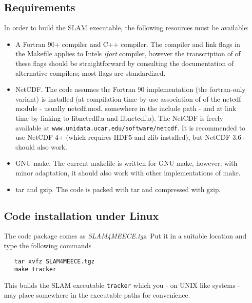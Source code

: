 \subsection{Requirements} 

In order to build the SLAM executable, the following resources must be
available:

\begin{itemize}
  \item A Fortran 90+ compiler and C++ compiler. The compiler and link flags
        in the Makefile applies to Intels {\em ifort} compiler,
        however the transcription of of these flags should be
        straightforward by consulting the documentation of 
        alternative compilers; most flags are standardized.
         
  \item NetCDF. The code assumes the Fortran 90 implementation
        (the fortran-only variant) is installed (at compilation time by use association of
        of the netcdf module - usually netcdf.mod, somewhere in the 
        include path - and at link time by linking to libnetcdff.a
        and libnetcdf.a). The NetCDF is freely available at 
        {\tt www.unidata.ucar.edu/software/netcdf}. It is recommended to 
        use NetCDF 4+ (which requires HDF5 and zlib installed), but
        NetCDF 3.6+ should also work.

  \item GNU make. The current makefile is written for GNU make, however,
        with minor adaptation, it should also work with other implementations 
        of make.

  \item tar and gzip. The code is packed with tar and compressed with gzip.

\end{itemize}

\subsection{Code installation under Linux}

The code package comes as {\it SLAM4MEECE.tgz}. Put it in a suitable location 
and type the following commands
\begin{verbatim}
   tar xvfz SLAM4MEECE.tgz
   make tracker
\end{verbatim}
This builds the SLAM executable {\tt tracker} which you - on UNIX like systems
- may place somewhere in the executable paths for convenience.


